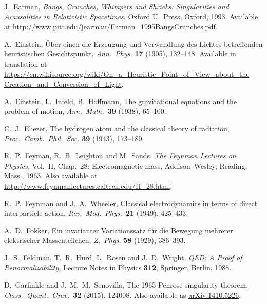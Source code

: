 \documentclass[12pt]{article}
\begin{document}
\begin{thebibliography}{10}
 J.\ Earman, \textsl{Bangs, Crunches, Whimpers and Shrieks: Singularities and Acausalities in Relativistic Spacetimes}, Oxford U.\ Press, Oxford,
1993.  Available at \href{http://www.pitt.edu/~jearman/Earman_1995BangsCrunches.pdf}{http://www.pitt.edu/\~jearman/Earman\_1995BangsCrunches.pdf}.

 A.\ Einstein, \"Uber einen die Erzeugung und Verwandlung des Lichtes betreffenden heuristischen Gesichtspunkt, \textsl{Ann.\ Phys.} \textbf{17} (1905), 132--148.  Available in translation at \href{https://en.wikisource.org/wiki/On_a_Heuristic_Point_of_View_about_the_Creation_and_Conversion_of_Light}{https://en.wikisource.org/wiki/On\_a\_Heuristic\_Point\_of\_View\_about\_the}
\href{https://en.wikisource.org/wiki/On_a_Heuristic_Point_of_View_about_the_Creation_and_Conversion_of_Light}{Creation\_and\_Conversion\_of\_Light}.

 A.\ Einstein, L.\ Infeld, B.\ Hoffmann, The gravitational equations and the problem of motion, \textsl{Ann.\ Math.\ }\textbf{39} (1938), 65--100.

 C.\ J.\ Eliezer, The hydrogen atom and the classical theory of
radiation, \textsl{Proc.\ Camb.\ Phil.\ Soc.} \textbf{39} (1943), 173--180.

 R.\ P.\ Feyman, R.\ B.\ Leighton and M.\ Sands. 
\textsl{The Feynman Lectures on Physics,} Vol.\ II, Chap.\ 28: Electromagnetic mass, Addison--Wesley, Reading, Mass., 1963.  Also available at \href{http://www.feynmanlectures.caltech.edu/II_28.html}
{http://www.feynmanlectures.caltech.edu/II\_28.html}.

 R.\ P.\ Feynman and J.\ A.\ Wheeler, 
Classical electrodynamics in terms of direct interparticle action, \textsl{Rev.\ Mod.\
Phys.\ }\textbf{21} (1949), 425--433.  
 
 A.\ D.\ Fokker, Ein invarianter Variationssatz f\"ur die Bewegung mehrerer elektrischer Massenteilchen, \textsl{Z.\ Phys.} \textbf{58} (1929), 386--393.

 J.\ S.\ Feldman, T.\ R.\ Hurd, L.\ Rosen and J.\ D.\ Wright, \textsl{QED: A Proof of Renormalizability,} Lecture Notes in Physics \textbf{312}, Springer, Berlin, 1988.

 D.\ Garfinkle and J.\ M.\ M.\ Senovilla, The 1965 Penrose singularity theorem, \textsl{Class.\ Quant.\ Grav.\ }\textbf{32} (2015), 124008.  Also available as \href{http://arxiv.org/abs/1410.5226}{arXiv:1410.5226}.


\end{thebibliography}
\end{document}
